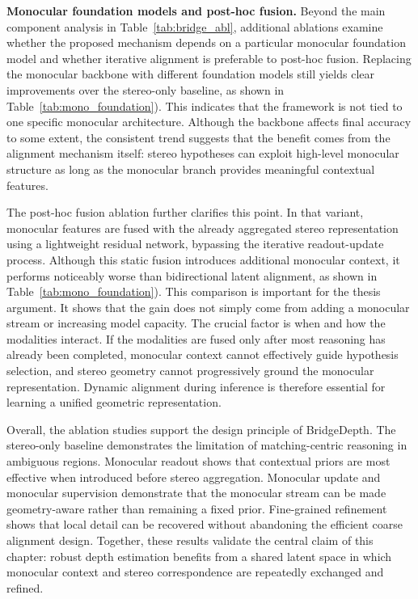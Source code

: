 \noindent\textbf{Monocular foundation models and post-hoc fusion.} 
Beyond the main component analysis in Table~\ref{tab:bridge_abl}, additional ablations examine whether the proposed mechanism depends on a particular monocular foundation model and whether iterative alignment is preferable to post-hoc fusion. 
Replacing the monocular backbone with different foundation models still yields clear improvements over the stereo-only baseline, as shown in Table~\ref{tab:mono_foundation}).
This indicates that the framework is not tied to one specific monocular architecture.
Although the backbone affects final accuracy to some extent, the consistent trend suggests that the benefit comes from the alignment mechanism itself: stereo hypotheses can exploit high-level monocular structure as long as the monocular branch provides meaningful contextual features.

The post-hoc fusion ablation further clarifies this point.
In that variant, monocular features are fused with the already aggregated stereo representation using a lightweight residual network, bypassing the iterative readout-update process.
Although this static fusion introduces additional monocular context, it performs noticeably worse than bidirectional latent alignment, as shown in Table~\ref{tab:mono_foundation}).
This comparison is important for the thesis argument.
It shows that the gain does not simply come from adding a monocular stream or increasing model capacity.
The crucial factor is when and how the modalities interact.
If the modalities are fused only after most reasoning has already been completed, monocular context cannot effectively guide hypothesis selection, and stereo geometry cannot progressively ground the monocular representation.
Dynamic alignment during inference is therefore essential for learning a unified geometric representation.

Overall, the ablation studies support the design principle of BridgeDepth.
The stereo-only baseline demonstrates the limitation of matching-centric reasoning in ambiguous regions.
Monocular readout shows that contextual priors are most effective when introduced before stereo aggregation.
Monocular update and monocular supervision demonstrate that the monocular stream can be made geometry-aware rather than remaining a fixed prior.
Fine-grained refinement shows that local detail can be recovered without abandoning the efficient coarse alignment design.
Together, these results validate the central claim of this chapter: robust depth estimation benefits from a shared latent space in which monocular context and stereo correspondence are repeatedly exchanged and refined.

